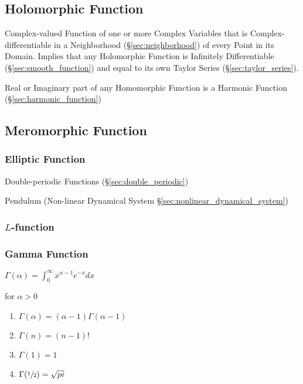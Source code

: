 \subsection{Holomorphic Function}\label{sec:holomorphic_function}

Complex-valued Function of one or more Complex Variables that is
Complex-differentiable in a Neighborhood (\S\ref{sec:neighborhood}) of
every Point in its Domain. Implies that any Holomorphic Function is
Infinitely Differentiable (\S\ref{sec:smooth_function}) and equal to
its own Taylor Series (\S\ref{sec:taylor_series}).

Real or Imaginary part of any Homomorphic Function is a Harmonic
Function (\S\ref{sec:harmonic_function})



\subsection{Meromorphic Function}\label{sec:meromorphic_function}

\subsubsection{Elliptic Function}\label{sec:elliptic_function}

Double-periodic Functions (\S\ref{sec:double_periodic})

Pendulum (Non-linear Dynamical System \S\ref{sec:nonlinear_dynamical_system})



\subsubsection{$L$-function}\label{sec:l_function}

\subsubsection{Gamma Function}\label{sec:gamma_function}

$\Gamma(\alpha) = \int_0^{\infty} x^{\alpha -1} e^{-x} dx$

for $\alpha > 0$

\begin{enumerate}
\item $\Gamma(\alpha) = (\alpha - 1) \Gamma(\alpha -1)$
\item $\Gamma(n) = (n-1)!$
\item $\Gamma(1) = 1$
\item $\Gamma(\sfrac{1}{2}) = \sqrt{pi}$
\end{enumerate}

